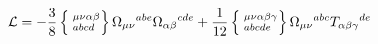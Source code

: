 \begin{equation}
{\cal L} = - \frac{3}{8} \left\{
\phantom{|}^{\mu\nu\alpha\beta}_{abcd} \right\}
\Omega_{\mu\nu}{}^{abe} \Omega_{\alpha\beta}{}^{cde} + \frac{1}{12}
\left\{ \phantom{|}^{\mu\nu\alpha\beta\gamma}_{abcde} \right\}
\Omega_{\mu\nu}{}^{abc} T_{\alpha\beta\gamma}{}^{de}
\end{equation}

